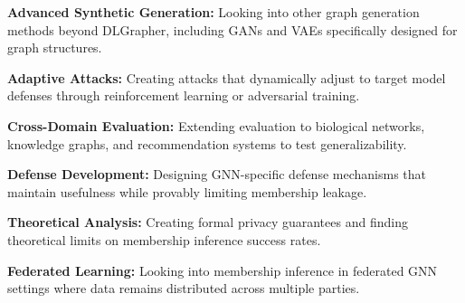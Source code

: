 \documentclass{article}
\begin{document}
\textbf{Advanced Synthetic Generation:} Looking into other graph generation methods beyond DLGrapher, including GANs and VAEs specifically designed for graph structures.

\textbf{Adaptive Attacks:} Creating attacks that dynamically adjust to target model defenses through reinforcement learning or adversarial training.

\textbf{Cross-Domain Evaluation:} Extending evaluation to biological networks, knowledge graphs, and recommendation systems to test generalizability.

\textbf{Defense Development:} Designing GNN-specific defense mechanisms that maintain usefulness while provably limiting membership leakage.

\textbf{Theoretical Analysis:} Creating formal privacy guarantees and finding theoretical limits on membership inference success rates.

\textbf{Federated Learning:} Looking into membership inference in federated GNN settings where data remains distributed across multiple parties.





\end{document}
